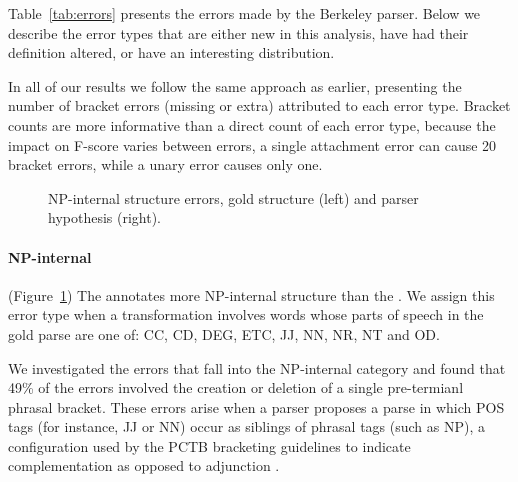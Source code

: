Table~\ref{tab:errors} presents the errors made by the Berkeley parser.
Below we describe the error types that are either new in this analysis, have had their definition altered, or have an interesting distribution.

In all of our results we follow the same approach as earlier, presenting the number of bracket errors (missing or extra) attributed to each error type.
Bracket counts are more informative than a direct count of each error type, because the impact on \parseval F-score varies between errors, \myeg a single attachment error can cause 20 bracket errors, while a unary error causes only one.

\begin{figure}
\centering
  \caption[Error analysis example: NP internal (Chinese).]{ \label{fig:np_internal} 
    NP-internal structure errors, gold structure (left) and parser hypothesis (right).
  }
\end{figure}

\paragraph{NP-internal} (Figure~\ref{fig:np_internal})
The \pctb annotates more NP-internal structure than the \ptb.
We assign this error type when a transformation involves words whose parts of speech in the gold parse are one of: CC, CD, DEG, ETC, JJ, NN, NR, NT and OD.

We investigated the errors that fall into the NP-internal category and found that 49\% of the errors involved the creation or deletion of a single pre-termianl phrasal bracket.
These errors arise when a parser proposes a parse in which POS tags (for instance, JJ or NN) occur as siblings of phrasal tags (such as NP), a configuration used by the PCTB bracketing guidelines to indicate complementation as opposed to adjunction \parencite{Xue:2005:NLE}.

